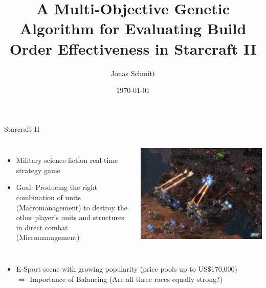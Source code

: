 \documentclass{beamer}
\title{A Multi-Objective Genetic Algorithm for Evaluating Build Order Effectiveness in Starcraft II} %
\author{Jonas Schmitt} %
\date{\today} %
\begin{document}
\begin{frame}
\titlepage %
\end{frame}

\begin{frame}{Starcraft II}
\begin{columns}[c] %
    \begin{itemize}
		\item Military science-fiction real-time strategy game
		\item \alert{Goal:} Producing the right combination of units (\alert{Macromanagement}) to destroy the other player's units and structures in direct combat (\alert{Micromanagement})
	\end{itemize}
    	\includegraphics[width=1.0\linewidth]{starcraft-2-screenshot.jpg}
\end{columns}
\begin{itemize}
\item E-Sport scene with growing popularity (price pools up to US\$170,000)
\\ $\Rightarrow$ Importance of \alert{Balancing} (Are all three races equally strong?) 
\end{itemize}
\end{frame}
\end{document}
